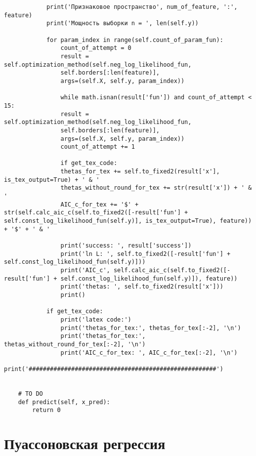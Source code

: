 \begin{verbatim}
            print('Признаковое пространство', num_of_feature, ':', feature)
            print('Мощность выборки n = ', len(self.y))
            
            for param_index in range(self.count_of_param_fun):
                count_of_attempt = 0
                result = self.optimization_method(self.neg_log_likelihood_fun,
                self.borders[:len(feature)],
                args=(self.X, self.y, param_index))
                
                while math.isnan(result['fun']) and count_of_attempt < 15:
                result = self.optimization_method(self.neg_log_likelihood_fun,
                self.borders[:len(feature)],
                args=(self.X, self.y, param_index))
                count_of_attempt += 1
                
                if get_tex_code:
                thetas_for_tex += self.to_fixed2(result['x'], is_tex_output=True) + ' & '
                thetas_without_round_for_tex += str(result['x']) + ' & '
                AIC_c_for_tex += '$' + str(self.calc_aic_c(self.to_fixed2([-result['fun'] + self.const_log_likelihood_fun(self.y)], is_tex_output=True), feature)) + '$' + ' & '
                
                print('success: ', result['success'])
                print('ln L: ', self.to_fixed2([-result['fun'] + self.const_log_likelihood_fun(self.y)]))
                print('AIC_c', self.calc_aic_c(self.to_fixed2([-result['fun'] + self.const_log_likelihood_fun(self.y)]), feature))
                print('thetas: ', self.to_fixed2(result['x']))
                print()
                
            if get_tex_code:
                print('latex code:')
                print('thetas_for_tex:', thetas_for_tex[:-2], '\n')
                print('thetas_for_tex:', thetas_without_round_for_tex[:-2], '\n')
                print('AIC_c_for_tex: ', AIC_c_for_tex[:-2], '\n')
                print('#####################################################') 
    
    
    # TO DO
    def predict(self, x_pred):
        return 0
\end{verbatim}


\section{Пуассоновская регрессия}

